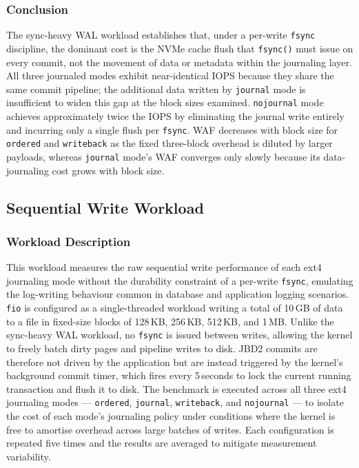 \documentclass[12pt,a4paper]{article}
\begin{document}
\subsubsection{Conclusion}
The sync-heavy WAL workload establishes that, under a per-write \texttt{fsync}
discipline, the dominant cost is the NVMe cache flush that \texttt{fsync()} must issue
on every commit, not the movement of data or metadata within the journaling layer. All
three journaled modes exhibit near-identical IOPS because they share the same commit
pipeline; the additional data written by \texttt{journal} mode is insufficient to
widen this gap at the block sizes examined. \texttt{nojournal} mode achieves
approximately twice the IOPS by eliminating the journal write entirely and incurring
only a single flush per \texttt{fsync}. WAF decreases with block size for
\texttt{ordered} and \texttt{writeback} as the fixed three-block overhead is diluted by
larger payloads, whereas \texttt{journal} mode's WAF converges only slowly because its
data-journaling cost grows with block size. 

\subsection{Sequential Write Workload}

\subsubsection{Workload Description}
This workload measures the raw sequential write performance of each ext4 journaling
mode without the durability constraint of a per-write \texttt{fsync}, emulating the
log-writing behaviour common in database and application logging scenarios.
\texttt{fio} is configured as a single-threaded workload writing a total of 10\,GB of
data to a file in fixed-size blocks of 128\,KB, 256\,KB, 512\,KB, and 1\,MB. Unlike
the sync-heavy WAL workload, no \texttt{fsync} is issued between writes, allowing the
kernel to freely batch dirty pages and pipeline writes to disk. JBD2 commits are
therefore not driven by the application but are instead triggered by the kernel's
background commit timer, which fires every 5\,seconds to lock the current running
transaction and flush it to disk. The benchmark is executed across all three ext4
journaling modes --- \texttt{ordered}, \texttt{journal}, \texttt{writeback}, and
\texttt{nojournal} --- to isolate the cost of each mode's journaling policy under
conditions where the kernel is free to amortise overhead across large batches of
writes. Each configuration is repeated five times and the results are averaged to
mitigate measurement variability.
\end{document}
